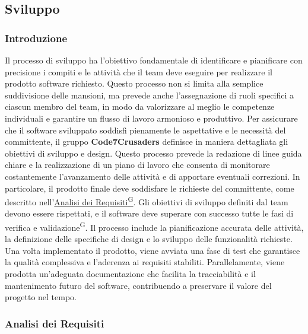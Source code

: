 
\subsection{Sviluppo}
\subsubsection{Introduzione}
Il processo di sviluppo ha l’obiettivo fondamentale di identificare e pianificare con precisione i compiti e le attività che il team deve eseguire per realizzare il prodotto software richiesto. Questo processo non si limita alla semplice suddivisione delle mansioni, ma prevede anche l’assegnazione di ruoli specifici a ciascun membro del team, in modo da valorizzare al meglio le competenze individuali e garantire un flusso di lavoro armonioso e produttivo.  
Per assicurare che il software sviluppato soddisfi pienamente le aspettative e le necessità del committente, il gruppo \textbf{Code7Crusaders} definisce in maniera dettagliata gli obiettivi di sviluppo e design. Questo processo prevede la redazione di linee guida chiare e la realizzazione di un piano di lavoro che consenta di monitorare costantemente l’avanzamento delle attività e di apportare eventuali correzioni. In particolare, il prodotto finale deve soddisfare le richieste del committente, come descritto nell’\href{https://code7crusaders.github.io/docs/RTB/documentazione_interna/glossario.html#analisi-dei-requisiti}{Analisi dei Requisiti\textsuperscript{G}}. 
Gli obiettivi di sviluppo definiti dal team devono essere rispettati, e il software deve superare con successo tutte le fasi di verifica e validazione\textsuperscript{G}. Il processo include la pianificazione accurata delle attività, la definizione delle specifiche di design e lo sviluppo delle funzionalità richieste. Una volta implementato il prodotto, viene avviata una fase di test che garantisce la qualità complessiva e l’aderenza ai requisiti stabiliti. Parallelamente, viene prodotta un’adeguata documentazione che facilita la tracciabilità e il mantenimento futuro del software, contribuendo a preservare il valore del progetto nel tempo.  

\subsubsection{Analisi dei Requisiti}

